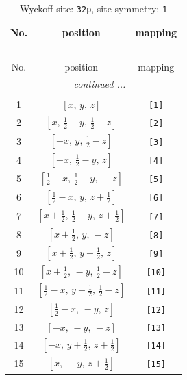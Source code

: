 \documentclass[fleqn,8pt]{jsarticle}
\begin{document}
\renewcommand{\arraystretch}{1.2}
\begin{longtable}{ccc}
\caption{Wyckoff site: {\tt 32p}, site symmetry: {\tt 1}}
 \\
 \hline \hline
No. & position & mapping \\ \hline \endfirsthead

\multicolumn{2}{l}{\tablename\ \thetable{}} \\
 \hline \hline
No. & position & mapping \\ \hline \endhead

 \hline \hline
\multicolumn{2}{r}{\footnotesize\it continued ...} \\ \endfoot

 \hline \hline
\multicolumn{2}{r}{} \\ \endlastfoot

1 & $\left[ x,\, y,\, z \right]$ & {\tt [1]} \\ \hline
2 & $\left[ x,\, \frac{1}{2} - y,\, \frac{1}{2} - z \right]$ & {\tt [2]} \\ \hline
3 & $\left[ - x,\, y,\, \frac{1}{2} - z \right]$ & {\tt [3]} \\ \hline
4 & $\left[ - x,\, \frac{1}{2} - y,\, z \right]$ & {\tt [4]} \\ \hline
5 & $\left[ \frac{1}{2} - x,\, \frac{1}{2} - y,\, - z \right]$ & {\tt [5]} \\ \hline
6 & $\left[ \frac{1}{2} - x,\, y,\, z + \frac{1}{2} \right]$ & {\tt [6]} \\ \hline
7 & $\left[ x + \frac{1}{2},\, \frac{1}{2} - y,\, z + \frac{1}{2} \right]$ & {\tt [7]} \\ \hline
8 & $\left[ x + \frac{1}{2},\, y,\, - z \right]$ & {\tt [8]} \\ \hline
9 & $\left[ x + \frac{1}{2},\, y + \frac{1}{2},\, z \right]$ & {\tt [9]} \\ \hline
10 & $\left[ x + \frac{1}{2},\, - y,\, \frac{1}{2} - z \right]$ & {\tt [10]} \\ \hline
11 & $\left[ \frac{1}{2} - x,\, y + \frac{1}{2},\, \frac{1}{2} - z \right]$ & {\tt [11]} \\ \hline
12 & $\left[ \frac{1}{2} - x,\, - y,\, z \right]$ & {\tt [12]} \\ \hline
13 & $\left[ - x,\, - y,\, - z \right]$ & {\tt [13]} \\ \hline
14 & $\left[ - x,\, y + \frac{1}{2},\, z + \frac{1}{2} \right]$ & {\tt [14]} \\ \hline
15 & $\left[ x,\, - y,\, z + \frac{1}{2} \right]$ & {\tt [15]} \\ \hline

\end{longtable}
\end{document}
